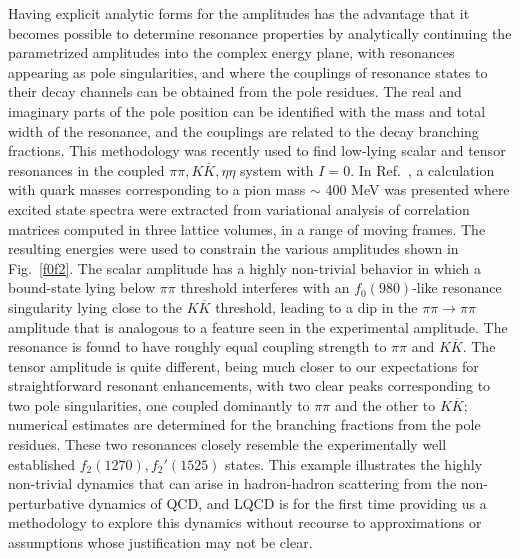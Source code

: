 Having explicit analytic forms for the amplitudes has the advantage that it becomes possible to determine resonance properties  by analytically continuing the parametrized amplitudes into the complex energy plane, with resonances appearing as pole singularities, and where the couplings of resonance states to their decay channels can be obtained from the pole residues. The real and imaginary parts of the pole position can be identified with the mass and total width of the resonance, and the couplings are related to the decay branching fractions.
%
This methodology was recently used to find low-lying scalar and tensor resonances in the coupled $\pi\pi, K\overline{K}, \eta\eta$ system with $I=0$. In Ref.~\cite{Briceno:2017qmb}, a calculation with quark masses corresponding to a pion mass $\sim$ 400 MeV was presented where excited state spectra were extracted from variational analysis of correlation matrices computed in three lattice volumes, in a range of moving frames. The resulting energies were used to constrain the various amplitudes shown in Fig.~\ref{f0f2}. The scalar amplitude has a highly non-trivial behavior in which a bound-state lying below $\pi\pi$ threshold interferes with an $f_0(980)$-like resonance singularity lying close to the $K\overline{K}$ threshold, leading to a {dip} in the $\pi\pi \to \pi \pi$ amplitude that is analogous to a feature seen in the experimental amplitude. The resonance is found to have roughly equal coupling strength to $\pi\pi$ and $K\overline{K}$. The tensor amplitude is quite different, being much closer to our expectations for straightforward resonant enhancements, with two clear peaks corresponding to two pole singularities, one coupled dominantly to $\pi\pi$ and the other to $K\overline{K}$; numerical estimates are determined for the branching fractions from the pole residues. These two resonances closely resemble the experimentally well established $f_2(1270), f_2'(1525)$ states.
%
This example illustrates the highly non-trivial dynamics that can arise in hadron-hadron scattering from the non-perturbative dynamics of QCD, and LQCD is for the first time providing us a methodology to explore this dynamics without recourse to approximations or assumptions whose justification may not be clear. 

